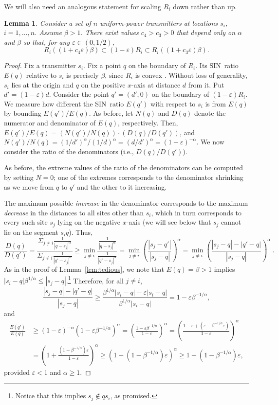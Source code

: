\documentclass[11pt]{article}
\newtheorem{lemma}[theorem]{Lemma}
\theoremstyle{remark}
\let\eps\varepsilon
\begin{document}
We will also need an analogous statement for scaling $R_i$ down rather than up.
\begin{lemma}
  \label{lem:tedious2}
  Consider a set of $n$ uniform-power transmitters at locations $s_i$, $i=1,\dots,n$. 
  Assume $\beta>1$. There exist values $c_4 > c_3 > 0$ that depend only on $\alpha$ and $\beta$ so that, for any $\eps \in (0,1/2)$, 
  \[
    R_i((1+c_4\eps)\beta) \subset (1-\eps)R_i \subset R_i((1+c_3\eps)\beta).
  \]
\end{lemma}
\begin{proof}
  Fix a transmitter $s_i$.  Fix a point $q$ on the boundary of $R_i$.  Its SIN~ratio $E(q)$ relative to $s_i$
  is precisely $\beta$, since $R_i$ is convex
  \cite{aeklpr-sdciawn-12}.  Without loss of generality, $s_i$ lies at
  the origin and $q$ on the positive $x$-axis at distance $d$ from it.
  Put $d'=(1-\eps)d$.  Consider the point $q'=(d',0)$ on the boundary
  of $(1-\eps)R_i$.  We measure how different the SIN~ratio $E(q')$ with respect to $s_i$ is
  from $E(q)$ by bounding $E(q')/E(q)$. 
  As before, let $N(q)$ and $D(q)$ denote the numerator and denominator of $E(q)$, respectively.
  Then, $E(q')/E(q) = (N(q')/N(q)) \cdot (D(q)/D(q'))$, and
  $N(q')/N(q) = (1/d')^\alpha/(1/d)^\alpha=(d/d')^\alpha = (1-\eps)^{-\alpha}$.
  We now consider the ratio of the denominators (i.e., $D(q)/D(q')$).
  
 As before, the extreme values of the ratio of the denominators can be computed by setting $N=0$; one of the extremes corresponds to the denominator shrinking as we move from $q$ to $q'$ and the other to it increasing.

The maximum possible \emph{increase} in the denominator
corresponds to the maximum \emph{decrease} in the distances to all sites other than $s_i$,
which in turn corresponds to every such site $s_j$ lying on the negative $x$-axis (we will see below that $s_j$ cannot lie on the segment $s_iq$).  
Thus,
  \[
     \frac{D(q)}{D(q')} = \frac{\Sigma_{j \ne i}{\frac{1}{|q-s_j|^\alpha}}}{\Sigma_{j \ne i}{\frac{1}{|q'-s_j|^\alpha}}} \ge
     \min_{j \ne i}\frac{\frac{1}{|q-s_j|^\alpha}}{\frac{1}{|q'-s_j|^\alpha}} = \min_{j \ne i}(\frac{|s_j-q'|}{|s_j-q|})^\alpha =
     \min_{j \ne i}(\frac{|s_j-q|-|q'-q|}{|s_j-q|})^\alpha \ .
  \]
  As in the proof of Lemma~\ref{lem:tedious}, we note that 
  $E(q)=\beta>1$ implies $|s_i-q| \beta^{1/\alpha} \leq |s_j-q|$.\footnote{Notice that this implies $s_j \not\in qs_i$, as promised.}
  Therefore, for all $j \ne i$,
  \[
    \frac{|s_j-q|-|q'-q|}{|s_j-q|} \geq \frac{\beta^{1/\alpha} |s_i-q|-\eps|s_i-q|}{\beta^{1/\alpha}
      |s_i-q|} =
{1-\eps\beta^{-1/\alpha}},
  \]
  and
  \begin{align*}
    \frac{E(q')}{E(q)} & \ge 
    (1-\eps)^{-\alpha}(1-\eps\beta^{-1/\alpha})^{\alpha}
    = (\frac{1-\eps\beta^{-1/\alpha}}{1-\eps})^\alpha 
    = (\frac{1-\eps + (\eps-\beta^{-1/\alpha}\eps)} {1-\eps})^\alpha\\
    &
      = (1 +  \frac { (1  - \beta^{-1/\alpha})\eps } { 1 - \eps})^\alpha
      \ge  (1 + (1  - \beta^{-1/\alpha })\eps)^\alpha
      \ge  1 + (1  - \beta^{-1/\alpha })\eps,
  \end{align*}
  provided $\eps < 1$ and $\alpha\geq 1$.



\end{proof}
\end{document}
